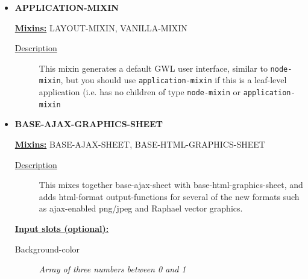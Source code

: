 \documentclass [11pt]{book}
\begin{document}
\begin{itemize}

\item {}
\textbf{APPLICATION-MIXIN}


\textbf{
\underline{Mixins:}} LAYOUT-MIXIN, VANILLA-MIXIN





\begin{description}

\item [
\underline{Description}]


This mixin generates a default GWL user interface, similar to \texttt{node-mixin}, but you should use
\texttt{application-mixin} if this is a leaf-level application (i.e. has no children of type \texttt{node-mixin}
or \texttt{application-mixin}



\end{description}









\item {}
\textbf{BASE-AJAX-GRAPHICS-SHEET}


\textbf{
\underline{Mixins:}} BASE-AJAX-SHEET, BASE-HTML-GRAPHICS-SHEET





\begin{description}

\item [
\underline{Description}]


This mixes together base-ajax-sheet 
with base-html-graphics-sheet, and adds html-format output-functions 
for several of the new formats such as ajax-enabled png/jpeg and 
Raphael vector graphics.



\end{description}








\textbf{
\underline{Input slots (optional):}}

\begin{description}

\item [Background-color]
\emph{Array of three numbers between 0 and 1}


\end{description}
\end{itemize}
\end{document}
